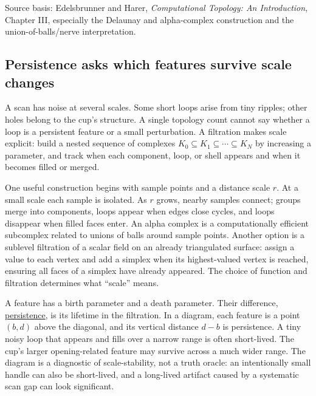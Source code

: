 Source basis: Edelsbrunner and Harer, \emph{Computational Topology: An Introduction}, Chapter III, especially the Delaunay and alpha-complex construction and the union-of-balls/nerve interpretation.

\subsection{Persistence asks which features survive scale changes}\label{03-visual-computing-i-ch002-persistence-asks-which-features-survive-scale-changes}

A scan has noise at several scales. Some short loops arise from tiny ripples; other holes belong to the cup's structure. A single topology count cannot say whether a loop is a persistent feature or a small perturbation. A filtration makes scale explicit: build a nested sequence of complexes \(K_0\subseteq K_1\subseteq\cdots\subseteq K_N\) by increasing a parameter, and track when each component, loop, or shell appears and when it becomes filled or merged.

One useful construction begins with sample points and a distance scale \(r\). At a small scale each sample is isolated. As \(r\) grows, nearby samples connect; groups merge into components, loops appear when edges close cycles, and loops disappear when filled faces enter. An alpha complex is a computationally efficient subcomplex related to unions of balls around sample points. Another option is a sublevel filtration of a scalar field on an already triangulated surface: assign a value to each vertex and add a simplex when its highest-valued vertex is reached, ensuring all faces of a simplex have already appeared. The choice of function and filtration determines what ``scale'' means.

A feature has a birth parameter and a death parameter. Their difference, \hyperref[appendix-e4d8ed8d6787]{persistence}, is its lifetime in the filtration. In a diagram, each feature is a point \((b,d)\) above the diagonal, and its vertical distance \(d-b\) is persistence. A tiny noisy loop that appears and fills over a narrow range is often short-lived. The cup's larger opening-related feature may survive across a much wider range. The diagram is a diagnostic of scale-stability, not a truth oracle: an intentionally small handle can also be short-lived, and a long-lived artifact caused by a systematic scan gap can look significant.

